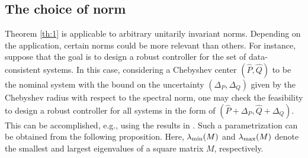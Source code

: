 \documentclass[pdflatex,sn-mathphys-num]{sn-jnl}%
\theoremstyle{thmstyleone}
\begin{document}
\subsection{The choice of norm}

Theorem \ref{th:1} is applicable to arbitrary unitarily invariant norms. Depending on the application, certain norms could be more relevant than others. For instance, suppose that the goal is to design a robust controller for the set of data-consistent systems. In this case, considering a Chebyshev center $(\hat{P},\hat{Q})$ to be the nominal system with the bound on the uncertainty $(\Delta_P,\Delta_Q)$ given by the Chebyshev radius with respect to the spectral norm, one may check the feasibility to design a robust controller for all systems in the form of $(\hat{P}+\Delta_P,\hat{Q}+\Delta_Q)$. This can be accomplished, e.g., using the results in \cite{khargonekar1990robust}. Such a parametrization can be obtained from the following proposition. Here, $\lambda_\textup{min}(M)$ and $\lambda_\textup{max}(M)$ denote the smallest and largest eigenvalues of a square matrix $M$, respectively. 
\end{document}
